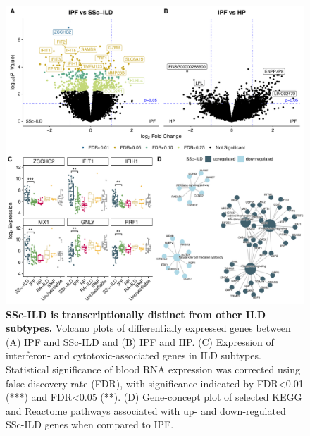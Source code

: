 \documentclass[
]{article}
\begin{document}
\begin{figure}

{\centering \includegraphics[width=1.0\linewidth,]{./Figures/BloodRNAseq/Fig1_Differential_Expression_v1} 

}

\caption[ILD blood transcriptome]{\textbf{SSc-ILD is transcriptionally distinct from other ILD subtypes.} Volcano plots of differentially expressed genes between (A) IPF and SSc-ILD and (B) IPF and HP. (C) Expression of interferon- and cytotoxic-associated genes in ILD subtypes. Statistical significance of blood RNA expression was corrected using false discovery rate (FDR), with significance indicated by FDR\textless0.01 (***) and FDR\textless0.05 (**). (D) Gene-concept plot of selected KEGG and Reactome pathways associated with up- and down-regulated SSc-ILD genes when compared to IPF.}\label{fig:degild}
\end{figure}
\end{document}
